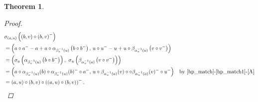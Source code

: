 \documentclass[preprint,1p]{elsarticle}
\newtheorem{theor}{Theorem}[section]
\theoremstyle{definition}               %
\begin{document}
\begin{theor}
\begin{proof}
       \begin{align*}
       &\sigma_{(a,u)}\left(\left(b,v\right)\circ\left(b,v\right)^-\right)
       \\
      &= \left(a\circ a^--a+ a\circ \alpha_{\beta_a^{-1}(u)}\left(b \circ b^-\right), \, u\circ u^--u+u\circ \beta_{\alpha_u^{-1}(a)}\left(v \circ v^- \right)\right)\\
       &=\left(\sigma_a \left(\alpha_{\beta_a^{-1}(u)}\left(b \circ b^-\right)\right), \ \sigma_u \left(\beta_{\alpha_u^{-1}(a)}\left(v \circ v^- \right)\right)\right)\\
       &=\left(a\circ \alpha_{\beta_a^{-1}(u)}(b) \circ \alpha_{\beta_a^{-1}(u)}(b)^-\circ a^-, \, u\circ\beta_{\alpha_u^{-1}(a)}(v) \circ \circ\beta_{\alpha_u^{-1}(a)}(v)^- \circ u^-\right)&\mbox{by \eqref{hp_match}-\eqref{hp_match1}-\eqref{A}}\\
       &=(a,u)\circ(b,v) \circ \left((a,u)\circ(b,v)\right)^-.
              \end{align*}      

\end{proof}
\end{theor}
\end{document}
